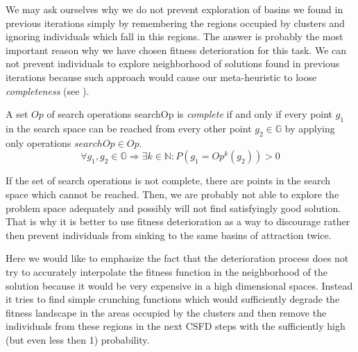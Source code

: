 We may ask ourselves why we do not prevent exploration of basins 
we found in previous iterations simply by remembering the regions occupied
by clusters and ignoring individuals which fall in this regions.
The answer is probably the most important reason why we have chosen fitness
deterioration for this task. 
We can not prevent individuals to explore
neighborhood of solutions found in previous iterations because such
approach would cause our meta-heuristic to loose \textit{completeness} (see
\cite{PardalosRomeijn2002}).

\begin{definition}\label{completeness}
A set $Op$ of search operations searchOp is \textit{complete}
if and only if every point $g_1$ in the search space 
can be reached from every other point $g_2 \in \mathbb{G}$ by applying
only operations $searchOp \in Op$.
\begin{equation}
\forall g_1, g_2 \in \mathbb{G} \Rightarrow \exists k \in \mathbb{N}:
P(g_1=Op^k(g_2)) > 0
\end{equation} 
\end{definition}

If the set of search operations is not complete, there are points 
in the search space which cannot be reached. 
Then, we are probably not able to explore the problem space adequately 
and possibly will not find satisfyingly good solution. 
That is why it is better to use fitness deterioration as a way to discourage
rather then prevent individuals from sinking to the same basins of attraction twice.

Here we would like to emphasize the fact that the
deterioration process does not try to accurately interpolate the fitness
function in the neighborhood of the solution because it would be very
expensive in a high dimensional spaces. Instead it tries to find simple
crunching functions which would sufficiently degrade the fitness landscape in the areas 
occupied by the clusters and then remove the individuals from these regions
in the next CSFD steps with the sufficiently high (but even less then 1) probability.


